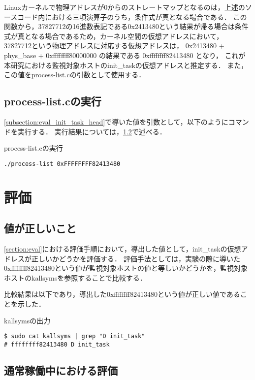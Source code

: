 Linuxカーネルで物理アドレスが0からのストレートマップとなるのは，上述のソースコード内における三項演算子のうち，条件式が真となる場合である．
この関数から，37827712の16進数表記である0x2413480という結果が帰る場合は条件式が真となる場合であるため，カーネル空間の仮想アドレスにおいて，
37827712という物理アドレスに対応する仮想アドレスは， 0x2413480 + phys\_base + 0xffffffff80000000 の結果である 0xffffffff82413480 となり，
これが本研究における監視対象ホストのinit_taskの仮想アドレスと推定する．
また，この値をprocess-list.cの引数として使用する．

\subsection{process-list.cの実行}

\ref{subsection:eval_init_task_head}で導いた値を引数として，以下のようにコマンドを実行する．
実行結果については，\ref{subsection:exec_process_list}で述べる．

\begin{itembox}[l]{process-list.cの実行}
    \begin{verbatim}
./process-list 0xFFFFFFFF82413480
    \end{verbatim}
\end{itembox}

\section{評価}

\subsection{値が正しいこと}

\ref{section:eval}における評価手順において，導出した値として，init_taskの仮想アドレスが正しいかどうかを評価する．
評価手法としては，実験の際に導いた0xffffffff82413480という値が監視対象ホストの値と等しいかどうかを，監視対象ホストのkallsymsを参照することで比較する．

比較結果は以下であり，導出した0xffffffff82413480という値が正しい値であることを示した．

\begin{itembox}[l]{kallsymsの出力}
    \begin{verbatim}
$ sudo cat kallsyms | grep "D init_task"
# ffffffff82413480 D init_task
    \end{verbatim}
\end{itembox}

\subsection{通常稼働中における評価}
\label{subsection:exec_process_list}

